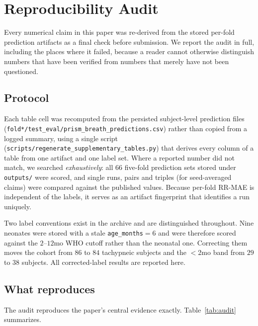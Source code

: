 \section{Reproducibility Audit}\label{app:repro}

Every numerical claim in this paper was re-derived from the stored per-fold prediction artifacts as a
final check before submission. We report the audit in full, including the places where it failed, because
a reader cannot otherwise distinguish numbers that have been verified from numbers that merely have not
been questioned.

\subsection{Protocol}
Each table cell was recomputed from the persisted subject-level prediction files
(\texttt{fold*/test\_eval/prism\_breath\_predictions.csv}) rather than copied from a logged summary, using
a single script (\texttt{scripts/regenerate\_supplementary\_tables.py}) that derives every column of a
table from one artifact and one label set. Where a reported number did not match, we searched
\emph{exhaustively}: all $66$ five-fold prediction sets stored under \texttt{outputs/} were scored, and
single runs, pairs and triples (for seed-averaged claims) were compared against the published values.
Because per-fold RR-MAE is independent of the labels, it serves as an artifact fingerprint that
identifies a run uniquely.

Two label conventions exist in the archive and are distinguished throughout. Nine neonates were stored
with a stale \texttt{age\_months}${=}6$ and were therefore scored against the $2$--$12$mo WHO cutoff
rather than the neonatal one. Correcting them moves the cohort from $86$ to $84$ tachypneic subjects and
the $<$2mo band from $29$ to $38$ subjects. All corrected-label results are reported here.

\subsection{What reproduces}
The audit reproduces the paper's central evidence exactly. Table~\ref{tab:audit} summarizes.

